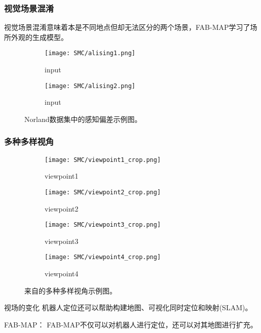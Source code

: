 \subsubsection{视觉场景混淆}
视觉场景混淆意味着本是不同地点但却无法区分的两个场景，FAB-MAP学习了场所外观的生成模型。
\begin{figure}[h]
	\centering
    \begin{subfigure}[h]{0.32\textwidth}
        \texttt{[image: SMC/alising1.png]}
        \caption{input}
    \end{subfigure}
	\vspace*{4mm}
    \begin{subfigure}[h]{0.32\textwidth}
        \texttt{[image: SMC/alising2.png]}
        \caption{input}
    \end{subfigure}
\caption{Norland数据集中的感知偏差示例图。}
\label{fig:alising_SMC}
\end{figure}

\subsubsection{多种多样视角}
\begin{figure}[h]
	\centering
	\begin{subfigure}[h]{0.23\textwidth}
		\texttt{[image: SMC/viewpoint1\_crop.png]}
		\caption{viewpoint1}
	\end{subfigure}
	\begin{subfigure}[h]{0.23\textwidth}
		\texttt{[image: SMC/viewpoint2\_crop.png]}
		\caption{viewpoint2}
	\end{subfigure}
	\begin{subfigure}[h]{0.23\textwidth}
		\texttt{[image: SMC/viewpoint3\_crop.png]}
		\caption{viewpoint3}
	\end{subfigure}
	\begin{subfigure}[h]{0.23\textwidth}
		\texttt{[image: SMC/viewpoint4\_crop.png]}
		\caption{viewpoint4}
	\end{subfigure}
	\caption{来自\cite{Philbin08}的多种多样视角示例图。}
	\label{fig:alising}
\end{figure}
视场的变化
机器人定位还可以帮助构建地图、可视化同时定位和映射(SLAM)\cite{Cummins2011Appearance,milford2012seqslam,Naseer2015Robust,Davison2007MonoSLAM,Engel2014LSD,Choset2001Topological,Mur2017ORB}。

FAB-MAP：\cite{Cummins2008FAB}
FAB-MAP不仅可以对机器人进行定位，还可以对其地图进行扩充。

